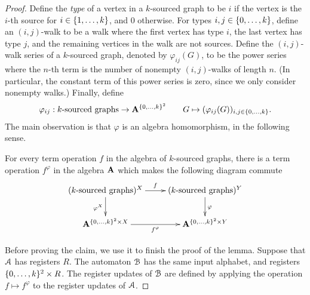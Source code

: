 \begin{proof}
    
    
    
        
        Define the \emph{type} of a vertex in a $k$-sourced graph to be  $i$ if the vertex is the $i$-th source for $i \in \{1,\ldots,k\}$, and $0$ otherwise. For types
        $i,j \in \{0,\ldots,k\}$,
        define an  $(i,j)$-walk to be a walk where the first vertex has type $i$, the last vertex has type $j$, and the remaining vertices in the walk are not sources. Define the $(i,j)$-walk series of a $k$-sourced graph, denoted by $\varphi_{ij}(G)$, to be the power series where the $n$-th term is the number of nonempty $(i,j)$-walks of length $n$. (In particular, the constant term  of this power series is zero, since we only consider nonempty walks.) Finally, define 
        \begin{align*}
        \varphi_{ij} : \text{$k$-sourced graphs} \to \mathbf{A}^{\{0,\ldots,k\}^2} \qquad G \mapsto (\varphi_{ij}(G))_{i,j \in \{0,\ldots,k\}}.
        \end{align*}
        The main observation is that $\varphi$ is an algebra homomorphism, in the following sense.
        \begin{claim}
            For every term operation $f$ 
            in the algebra of $k$-sourced graphs, there is a term operation $f^\varphi$ in the algebra $\mathbf{A}$ which makes the following diagram commute
            \begin{align*}
            \xymatrix{
                (\text{$k$-sourced graphs})^X 
                \ar[r]^f
                \ar[d]_{\varphi^X}
                &
                 (\text{$k$-sourced graphs})^Y
                \ar[d]^\varphi
                \\
                \aalg^{\set{0,\ldots,k}^2 \times X}
                \ar[r]_{f^\varphi}
                &
                \aalg^{\set{0,\ldots,k}^2 \times Y}
            }
            \end{align*}
        \end{claim}
        Before proving the claim, we use it to finish the proof of the lemma. Suppose that ${\mathcal A}$ has registers $R$. The automaton ${\mathcal B}$ has the same input alphabet, and registers $\{0,\ldots,k\}^2  \times R$.  The register updates of ${\mathcal B}$ are defined by applying the operation $f \mapsto f^\varphi$ to the register updates of ${\mathcal A}$. 

\end{proof}
